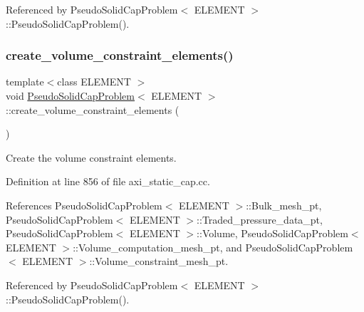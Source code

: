 Referenced by Pseudo\+Solid\+Cap\+Problem$<$ E\+L\+E\+M\+E\+N\+T $>$\+::\+Pseudo\+Solid\+Cap\+Problem().

\mbox{\label{classPseudoSolidCapProblem_a0289801610e2bc864c67d4d8557d56b1}} 
\subsubsection{\texorpdfstring{create\+\_\+volume\+\_\+constraint\+\_\+elements()}{create\_volume\_constraint\_elements()}}
{\footnotesize\ttfamily template$<$class E\+L\+E\+M\+E\+NT $>$ \\
void \hyperlink{classPseudoSolidCapProblem}{Pseudo\+Solid\+Cap\+Problem}$<$ E\+L\+E\+M\+E\+NT $>$\+::create\+\_\+volume\+\_\+constraint\+\_\+elements (\begin{DoxyParamCaption}{ }\end{DoxyParamCaption})\hspace{0.3cm}{\ttfamily [private]}}



Create the volume constraint elements. 



Definition at line 856 of file axi\+\_\+static\+\_\+cap.\+cc.



References Pseudo\+Solid\+Cap\+Problem$<$ E\+L\+E\+M\+E\+N\+T $>$\+::\+Bulk\+\_\+mesh\+\_\+pt, Pseudo\+Solid\+Cap\+Problem$<$ E\+L\+E\+M\+E\+N\+T $>$\+::\+Traded\+\_\+pressure\+\_\+data\+\_\+pt, Pseudo\+Solid\+Cap\+Problem$<$ E\+L\+E\+M\+E\+N\+T $>$\+::\+Volume, Pseudo\+Solid\+Cap\+Problem$<$ E\+L\+E\+M\+E\+N\+T $>$\+::\+Volume\+\_\+computation\+\_\+mesh\+\_\+pt, and Pseudo\+Solid\+Cap\+Problem$<$ E\+L\+E\+M\+E\+N\+T $>$\+::\+Volume\+\_\+constraint\+\_\+mesh\+\_\+pt.



Referenced by Pseudo\+Solid\+Cap\+Problem$<$ E\+L\+E\+M\+E\+N\+T $>$\+::\+Pseudo\+Solid\+Cap\+Problem().

\mbox{\label{classPseudoSolidCapProblem_a2fb98a37bde5742cbdf3c91cb1f5eb2f}} 

